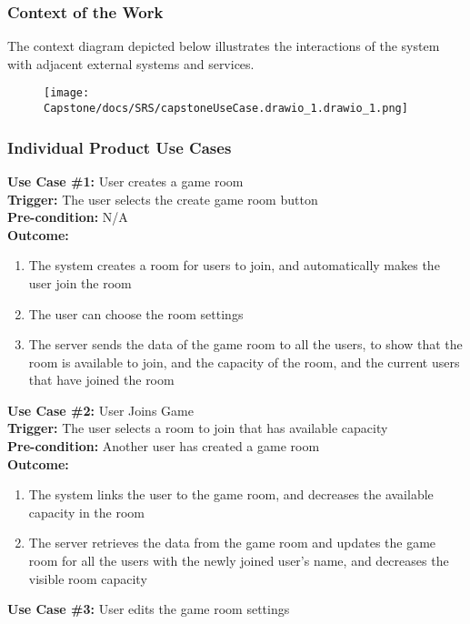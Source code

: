 \documentclass[12pt]{article}
\begin{document}
\subsubsection{Context of the Work}
The context diagram depicted below illustrates the interactions of the system with adjacent
external systems and services.
\begin{figure}[htbp]
\centerline{\texttt{[image: Capstone/docs/SRS/capstoneUseCase.drawio\_1.drawio\_1.png]}}
\label{UseCaseDiagram}
\end{figure}

\newpage
\subsubsection{Individual Product Use Cases}

\textbf{Use Case \#1:} User creates a game room\\
\textbf{Trigger:} The user selects the create game room button\\
\textbf{Pre-condition:} N/A\\
\textbf{Outcome:}
\begin{enumerate}
	\item The system creates a room for users to join, and automatically makes the user join the room
    \item The user can choose the room settings
	\item The server sends the data of the game room to all the users, to show that the room is available to join, and the capacity of the room, and the current users that have joined the room
\end{enumerate}
\textbf{Use Case \#2:} User Joins Game\\
\textbf{Trigger:} The user selects a room to join that has available capacity\\
\textbf{Pre-condition:} Another user has created a game room\\
\textbf{Outcome:}
\begin{enumerate}
	\item The system links the user to the game room, and decreases the available capacity in the room
    \item The server retrieves the data from the game room and updates the game room for all the users with the newly joined user's name, and decreases the visible room capacity
\end{enumerate}
\textbf{Use Case \#3:} User edits the game room settings\\
\end{document}
